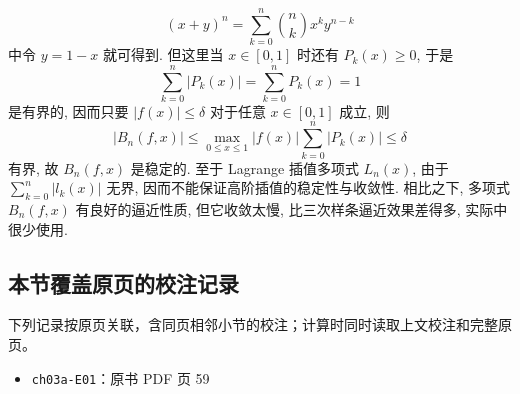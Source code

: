 \documentclass[
  10pt,
  fontset=fandol]{ctexart}
\providecommand{\tightlist}{%
  \setlength{\itemsep}{0pt}\setlength{\parskip}{0pt}}
\begin{document}
\[
(x+y)^n = \sum_{k=0}^{n} \binom{n}{k} x^k y^{n-k} \tag{3.1.6}
\] 中令 \(y=1-x\) 就可得到. 但这里当 \(x \in [0,1]\) 时还有 \(P_k(x) \geqslant 0\), 于是 \[
\sum_{k=0}^{n} |P_k(x)| = \sum_{k=0}^{n} P_k(x) = 1
\] 是有界的, 因而只要 \(|f(x)| \leqslant \delta\) 对于任意 \(x \in [0,1]\) 成立, 则 \[
|B_n(f,x)| \leqslant \max_{0 \leqslant x \leqslant 1} |f(x)| \sum_{k=0}^{n} |P_k(x)| \leqslant \delta
\] 有界, 故 \(B_n(f,x)\) 是稳定的. 至于 Lagrange 插值多项式 \(L_n(x)\), 由于 \(\sum_{k=0}^{n} |l_k(x)|\) 无界, 因而不能保证高阶插值的稳定性与收敛性. 相比之下, 多项式 \(B_n(f,x)\) 有良好的逼近性质, 但它收敛太慢, 比三次样条逼近效果差得多, 实际中很少使用.

\subsection{本节覆盖原页的校注记录}\label{ux672cux8282ux8986ux76d6ux539fux9875ux7684ux6821ux6ce8ux8bb0ux5f55}

下列记录按原页关联，含同页相邻小节的校注；计算时同时读取上文校注和完整原页。

\begin{itemize}
\tightlist
\item
  \texttt{ch03a-E01}：原书 PDF 页 59
\end{itemize}
\end{document}

